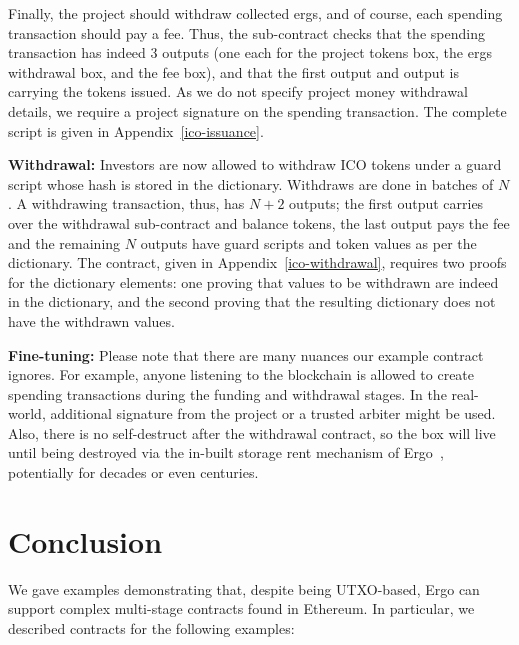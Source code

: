 \documentclass[runningheads]{llncs}
\begin{document}
Finally, the project should withdraw collected ergs, and of course, each spending transaction should pay a fee. Thus, the sub-contract checks that the spending transaction has indeed 3 outputs (one each for the project tokens box, the ergs withdrawal box, and the fee box), and that the first output and output is carrying the tokens issued. As we do not specify project money withdrawal details, we require a project signature on the spending transaction. The complete script is given in Appendix~\ref{ico-issuance}.

\textbf{Withdrawal:}
Investors are now allowed to withdraw ICO tokens under a guard script whose hash is stored in the dictionary. Withdraws are done in batches of $N$. A withdrawing transaction, thus, has $N + 2$ outputs; the first output carries over the withdrawal sub-contract and balance tokens, the last output pays the fee and the remaining $N$ outputs have guard scripts and token values as per the dictionary. The contract, given in Appendix~\ref{ico-withdrawal}, requires two proofs for the dictionary elements: one proving that values to be withdrawn are indeed in the dictionary, and the second proving that the resulting dictionary does not have the withdrawn values. 


\textbf{Fine-tuning:} Please note that there are many nuances our example contract ignores. For example, anyone listening to the blockchain is allowed to create spending transactions during the funding and withdrawal stages. In the real-world, additional signature from the project or a trusted arbiter might be used. Also, there is no self-destruct after the withdrawal contract, so the box will live until being destroyed via the in-built storage rent mechanism of Ergo~\cite{tutorial}, potentially for decades or even centuries. 

\section{Conclusion}

We gave examples demonstrating that, despite being UTXO-based, Ergo can support complex multi-stage contracts found in Ethereum. In particular, we described  contracts for the following examples: 
\end{document}
